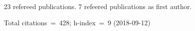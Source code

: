 23 refereed publications. 7 refeered publications as first author.

               Total citations~=~428; h-index~=~9 (2018-09-12)
